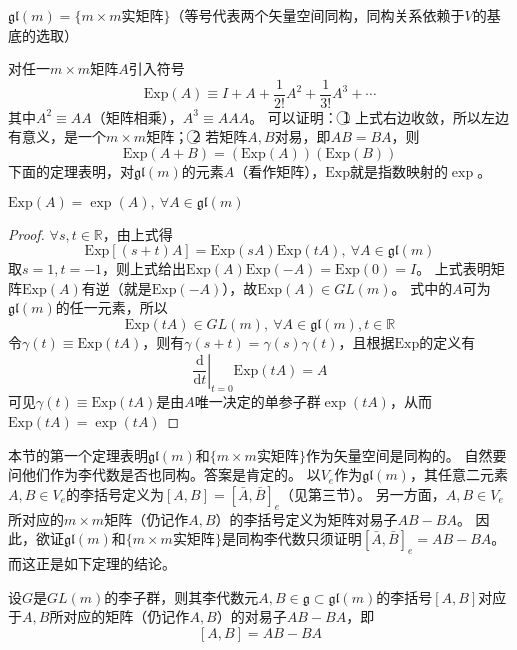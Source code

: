 \begin{theorem}
    $\mathfrak{gl}(m) = \{m \times m\text{实矩阵}\}$（等号代表两个矢量空间同构，同构关系依赖于$V$的基底的选取）
\end{theorem}

对任一$m \times m$矩阵$A$引入符号
$$\mathrm{Exp}(A) \equiv I + A + \frac{1}{2!}A^2 + \frac{1}{3!}A^3 + \cdots$$
其中$A^2 \equiv AA$（矩阵相乘），$A^3 \equiv AAA$。
可以证明：
\textcircled{1} 上式右边收敛，所以左边有意义，是一个$m \times m$矩阵；
\textcircled{2} 若矩阵$A, B$对易，即$AB = BA$，则
$$\mathrm{Exp}(A + B) = (\mathrm{Exp}(A))(\mathrm{Exp}(B))$$
下面的定理表明，对$\mathfrak{gl}(m)$的元素$A$（看作矩阵），$\mathrm{Exp}$就是指数映射的$\exp$。

\begin{theorem}
    $\mathrm{Exp}(A) = \exp(A), ~ \forall A \in \mathfrak{gl}(m)$
\end{theorem}

\begin{proof}
    $\forall s, t \in \mathbb{R}$，由上式得
    $$\mathrm{Exp}[(s + t)A] = \mathrm{Exp}(sA)\mathrm{Exp}(tA), ~ \forall A \in \mathfrak{gl}(m)$$
    取$s = 1, t = -1$，则上式给出$\mathrm{Exp}(A)\mathrm{Exp}(-A) = \mathrm{Exp}(0) = I$。
    上式表明矩阵$\mathrm{Exp}(A)$有逆（就是$\mathrm{Exp}(-A)$），故$\mathrm{Exp}(A) \in GL(m)$。
    式中的$A$可为$\mathfrak{gl}(m)$的任一元素，所以
    $$\mathrm{Exp}(tA) \in GL(m), ~ \forall A \in \mathfrak{gl}(m), t \in \mathbb{R}$$
    令$\gamma(t) \equiv \mathrm{Exp}(tA)$，则有$\gamma(s + t) = \gamma(s)\gamma(t)$，且根据$\mathrm{Exp}$的定义有
    $$\left.\frac{\mathrm{d}}{\mathrm{d}t}\right|_{t = 0}\mathrm{Exp}(tA) = A$$
    可见$\gamma(t) \equiv \mathrm{Exp}(tA)$是由$A$唯一决定的单参子群$\exp(tA)$，从而$\mathrm{Exp}(tA) = \exp(tA)$
\end{proof}

本节的第一个定理表明$\mathfrak{gl}(m)$和$\{m \times m\text{实矩阵}\}$作为矢量空间是同构的。
自然要问他们作为李代数是否也同构。答案是肯定的。
以$V_e$作为$\mathfrak{gl}(m)$，其任意二元素$A, B \in V_e$的李括号定义为$[A, B] = [\bar A, \bar B]_e$（见第三节）。
另一方面，$A, B \in V_e$所对应的$m \times m$矩阵（仍记作$A, B$）的李括号定义为矩阵对易子$AB - BA$。
因此，欲证$\mathfrak{gl}(m)$和$\{m \times m\text{实矩阵}\}$是同构李代数只须证明$[\bar A, \bar B]_e = AB - BA$。
而这正是如下定理的结论。

\begin{theorem}
    设$G$是$GL(m)$的李子群，则其李代数元$A, B \in \mathfrak{g} \subset \mathfrak{gl}(m)$的李括号$[A, B]$对应于$A, B$所对应的矩阵（仍记作$A, B$）的对易子$AB - BA$，即
    $$[A, B] = AB - BA$$
\end{theorem}

